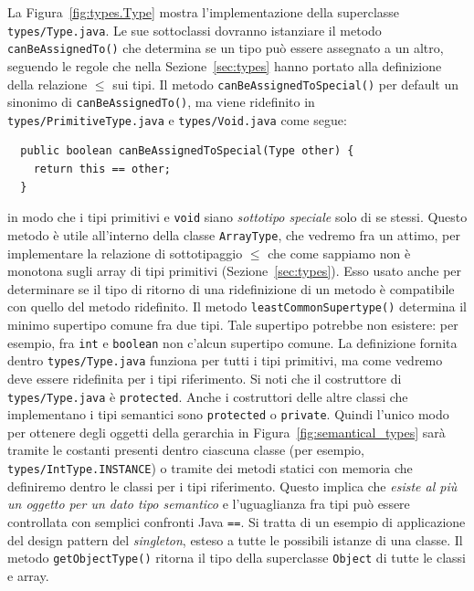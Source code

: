 La Figura~\ref{fig:types.Type} mostra l'implementazione della superclasse
\texttt{types/Type.java}. Le sue sottoclassi dovranno istanziare
il metodo \texttt{canBeAssignedTo()} che determina
se un tipo pu\`o essere assegnato a un
altro, seguendo le regole che nella Sezione~\ref{sec:types}
hanno portato alla definizione della relazione $\le$ sui tipi. Il metodo
\texttt{canBeAssignedToSpecial()} \e per default un sinonimo di
\texttt{canBeAssignedTo()}, ma viene ridefinito in
\texttt{types/PrimitiveType.java} e \texttt{types/Void.java} come segue:
%
\begin{verbatim}
  public boolean canBeAssignedToSpecial(Type other) {
    return this == other;
  }
\end{verbatim}
%
in modo che i tipi primitivi e \texttt{void} siano
\emph{sottotipo speciale} solo di se stessi. Questo metodo \`e
utile all'interno della classe \texttt{ArrayType}, che vedremo fra un attimo,
per implementare la relazione di sottotipaggio $\le$ che come sappiamo
non \`e monotona sugli array di tipi primitivi (Sezione~\ref{sec:types}).
Esso \e usato anche per determinare se il tipo di ritorno di una ridefinizione
di un metodo \`e compatibile con quello del metodo ridefinito.
Il metodo \texttt{leastCommonSupertype()} determina il minimo supertipo comune
fra due tipi. Tale supertipo potrebbe non esistere: per esempio, fra
\texttt{int} e \texttt{boolean} non c'\e alcun supertipo comune.
La definizione fornita dentro
\texttt{types/Type.java} funziona per tutti i tipi primitivi, ma come
vedremo deve essere ridefinita per i tipi riferimento.
Si noti che il costruttore di \texttt{types/Type.java} \`e \texttt{protected}.
Anche i costruttori delle altre classi che implementano i tipi semantici sono
\texttt{protected} o \texttt{private}. Quindi
l'unico modo per ottenere degli oggetti della
gerarchia in Figura~\ref{fig:semantical_types} sar\`a tramite le costanti
presenti dentro ciascuna classe (per esempio, \texttt{types/IntType.INSTANCE})
o tramite dei metodi statici con memoria che
definiremo dentro le classi per i tipi riferimento. Questo implica
che \emph{esiste al pi\`u un oggetto per un dato tipo semantico}
e l'uguaglianza fra tipi pu\`o essere controllata con
semplici confronti Java \texttt{==}. Si tratta di un esempio di applicazione
del design pattern del \emph{singleton}, esteso a tutte le possibili istanze
di una classe. Il metodo \texttt{getObjectType()}
ritorna il tipo della superclasse \texttt{Object} di tutte le classi e array.

